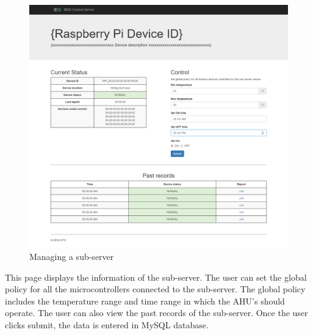 \documentclass[letterpaper,11pt]{report}
\begin{document}
\newpage
\begin{figure}[h]
\includegraphics[width=\textwidth]{raspberrypi}
\centering
\captionsetup{justification=centering}
\caption{Managing a sub-server}
\label{fig:raspberrypi}
\end{figure}
This page displays the information of the sub-server. The user can set the global policy for all the microcontrollers connected to the sub-server. The global policy includes the temperature range and time range in which the AHU’s should operate. The user can also view the past records of the sub-server. Once the user clicks submit, the data is entered in MySQL database.
\end{document}
